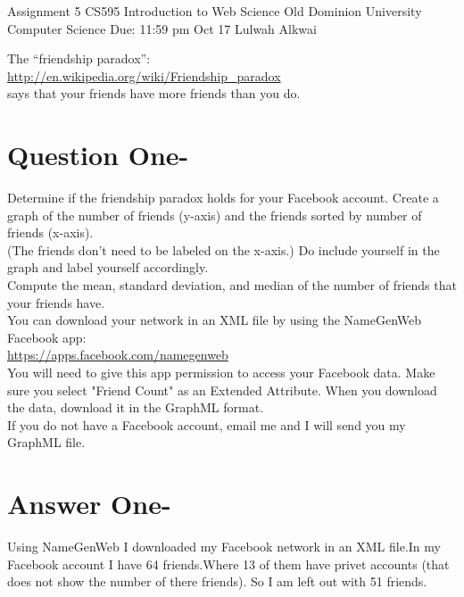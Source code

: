 \documentclass[letterpaper,11pt]{article}
\begin{document}
\begin{titlepage}
\begin{center}


\Huge{Assignment 5}
\newline
\Large{CS595}
\newline
\Large{Introduction to Web Science}
\newline
\Large{Old Dominion University}
\newline
\Large{Computer Science}
\newline
\Large{Due: 11:59 pm Oct 17}
\newline
\Large{Lulwah Alkwai}
\newline
\end{center}
\end{titlepage}
\newpage


The “friendship paradox”: \\
\url{http://en.wikipedia.org/wiki/Friendship_paradox}\\
says that your friends have more friends than you do. 
\section*{ Question One-}

Determine if the friendship paradox holds for your Facebook account. Create a graph of the number of friends (y-axis) and the friends sorted by number of friends (x-axis). \\

(The friends don't need to be labeled on the x-axis.) Do include yourself in the graph and label yourself accordingly. \\

Compute the mean, standard deviation, and median of the number of friends that your friends have. \\

You can download your network in an XML file by using the NameGenWeb Facebook app:  \\
\url{https://apps.facebook.com/namegenweb} \\

You will need to give this app permission to access your Facebook data. Make sure you select "Friend Count" as an Extended Attribute. When you download the data, download it in the GraphML format. \\
If you do not have a Facebook account, email me and I will send you my GraphML file.


\pagebreak
\section*{Answer One-}
Using NameGenWeb I downloaded my Facebook network in an XML file.In my Facebook account I have 64 friends.Where 13 of them have privet accounts (that does not show the number of there friends). So I am left out with 51 friends.
\end{document}
